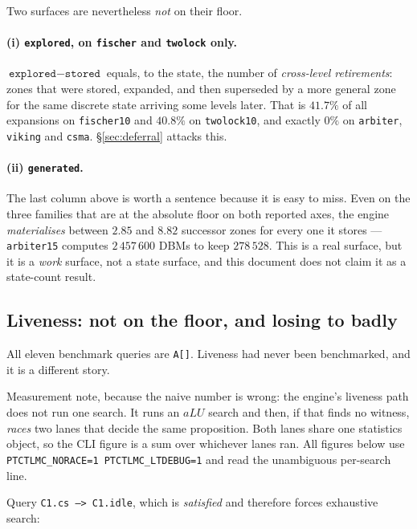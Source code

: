 Two surfaces are nevertheless \emph{not} on their floor.

\paragraph{(i) \texttt{explored}, on \texttt{fischer} and \texttt{twolock} only.}
$\texttt{explored} - \texttt{stored}$ equals, to the state, the number of \emph{cross-level
retirements}: zones that were stored, expanded, and then superseded by a more general zone for the
same discrete state arriving some levels later. That is $41.7\%$ of all expansions on
\texttt{fischer10} and $40.8\%$ on \texttt{twolock10}, and exactly $0\%$ on \texttt{arbiter},
\texttt{viking} and \texttt{csma}. \S\ref{sec:deferral} attacks this.

\paragraph{(ii) \texttt{generated}.}
The last column above is worth a sentence because it is easy to miss. Even on the three families
that are at the absolute floor on both reported axes, the engine \emph{materialises} between
$2.85$ and $8.82$ successor zones for every one it stores --- \texttt{arbiter15} computes
$2\,457\,600$ DBMs to keep $278\,528$. This is a real surface, but it is a \emph{work} surface, not
a state surface, and this document does not claim it as a state-count result.

\subsection{Liveness: not on the floor, and losing to \uppaal{} badly}
\label{sec:floor:liveness}

All eleven benchmark queries are \texttt{A[]}. Liveness had never been benchmarked, and it is a
different story.

Measurement note, because the naive number is wrong: the engine's liveness path does not run one
search. It runs an $aLU$ search and then, if that finds no witness, \emph{races} two lanes that
decide the same proposition. Both lanes share one statistics object, so the CLI figure is a sum
over whichever lanes ran. All figures below use \texttt{PTCTLMC\_NORACE=1 PTCTLMC\_LTDEBUG=1} and
read the unambiguous per-search line.

Query \texttt{C1.cs --> C1.idle}, which is \emph{satisfied} and therefore forces exhaustive search:

